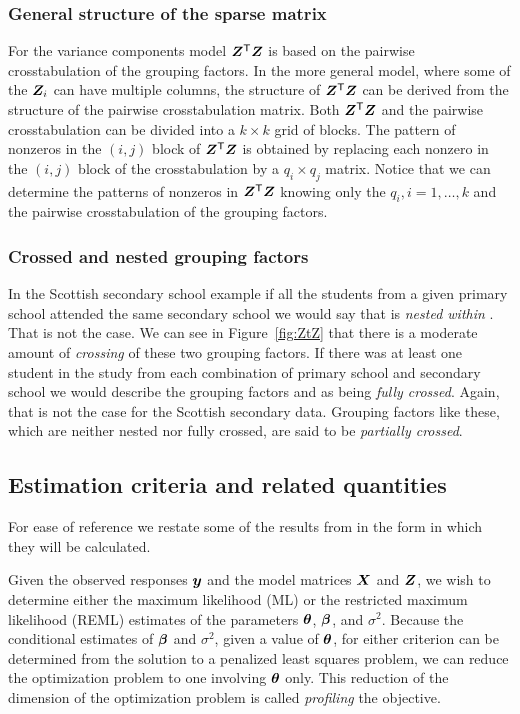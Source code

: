\documentclass[12pt]{article}
\begin{document}
\subsubsection{General structure of the sparse matrix}
\label{ssec:Sparse}

For the variance components model $\bm{Z}^\mathsf{T}\bm{Z}$ is based on the
pairwise crosstabulation of the grouping factors.  In the more general
model, where some of the $\bm{Z}_i$ can have multiple columns, the
structure of $\bm{Z}^\mathsf{T}\bm{Z}$ can be derived from the structure of the
pairwise crosstabulation matrix.  Both $\bm{Z}^\mathsf{T}\bm{Z}$ and the pairwise
crosstabulation can be divided into a $k\times k$ grid of blocks.  The
pattern of nonzeros in the $(i,j)$ block of $\bm{Z}^\mathsf{T}\bm{Z}$ is
obtained by replacing each nonzero in the $(i,j)$ block of the
crosstabulation by a $q_i\times q_j$ matrix.  Notice that we can
determine the patterns of nonzeros in $\bm{Z}^\mathsf{T}\bm{Z}$ knowing only the
$q_i,i=1,\dots,k$ and the pairwise crosstabulation of the grouping
factors.

\subsubsection{Crossed and nested grouping factors}
\label{ssec:Crossed}

In the Scottish secondary school example if all the students from a
given primary school attended the same secondary school we would say
that  is \emph{nested within} .  That is not
the case.  We can see in Figure~\ref{fig:ZtZ} that there is a moderate
amount of \emph{crossing} of these two grouping factors.  If there was
at least one student in the study from each combination of primary
school and secondary school we would describe the grouping factors
 and  as being \emph{fully crossed}.  Again,
that is not the case for the Scottish secondary data.  Grouping
factors like these, which are neither nested nor fully crossed, are
said to be \emph{partially crossed}.

\subsection{Estimation criteria and related quantities}
\label{ssec:ModelCriteria}

For ease of reference we restate some of the results from
\citet{bate:debr:2004} in the form in which they will be calculated.

Given the observed responses $\bm{y}$ and the model matrices $\bm{X}$ and
$\bm{Z}$, we wish to determine either the maximum likelihood (ML) or the
restricted maximum likelihood (REML) estimates of the parameters
$\bm{\theta}$, $\bm{\beta}$, and $\sigma^2$.  Because the conditional
estimates of $\bm{\beta}$ and $\sigma^2$, given a value of $\bm{\theta}$, for
either criterion can be determined from the solution to a penalized
least squares problem, we can reduce the optimization problem to one
involving $\bm{\theta}$ only.  This reduction of the dimension of the
optimization problem is called \emph{profiling} the objective.
\end{document}
